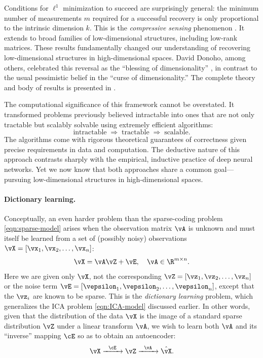 \documentclass[../../book-main.tex]{subfiles}
\begin{document}
Conditions for \(\ell^{1}\) minimization to succeed are surprisingly
general: the minimum number of measurements \(m\) required for a
successful recovery is only proportional to the intrinsic dimension
\(k\). This is the \textit{compressive sensing} phenomenon
\cite{CandesE2006-ICM}. It extends to broad families of
low-dimensional structures, including low-rank matrices. These
results fundamentally changed our understanding of recovering
low-dimensional structures in high-dimensional spaces. David Donoho,
among others, celebrated this reversal as the ``blessing of
dimensionality'' \cite{DonohoD2000}, in contrast to the usual
pessimistic belief in the ``curse of dimensionality.'' The complete
theory and body of results is presented in \cite{Wright-Ma-2022}.

The computational significance of this framework cannot be
overstated. It transformed problems previously believed intractable
into ones that are not only tractable but scalably solvable using
extremely efficient algorithms:
\begin{equation}
    \text{intractable} \;\Longrightarrow\; \text{tractable}
    \;\Longrightarrow\; \text{scalable}.
\end{equation}
The algorithms come with rigorous theoretical guarantees of
correctness given precise requirements in data and computation. The
deductive nature of this approach contrasts sharply with the
empirical, inductive practice of deep neural networks. Yet we now
know that both approaches share a common goal---pursuing
low-dimensional structures in high-dimensional spaces.

\paragraph{Dictionary learning.}
Conceptually, an even harder problem than the sparse-coding problem
\eqref{eqn:sparse-model} arises when the observation matrix \(\vA\)
is unknown and must itself be learned from a set of (possibly noisy)
observations \(\vX = [\vx_{1}, \vx_{2}, \ldots, \vx_{n}]\):
\begin{equation}
    \vX = \vA \vZ + \vE, \quad \vA \in \R^{m\times n}.
    \label{eqn:dictionary-learning}
\end{equation}
Here we are given only \(\vX\), not the corresponding \(\vZ =
[\vz_{1}, \vz_{2}, \ldots, \vz_{n}]\) or the noise term \(\vE =
[\vepsilon_{1}, \vepsilon_{2}, \ldots, \vepsilon_{n}]\), except that
the \(\vz_{i}\) are known to be sparse. This is the
\textit{dictionary learning} problem, which generalizes the ICA
problem \eqref{eqn:ICA-model} discussed earlier. In other words,
given that the distribution of the data \(\vX\) is the image of a
standard sparse distribution \(\vZ\) under a linear transform
\(\vA\), we wish to learn both \(\vA\) and its ``inverse'' mapping
\(\cE\) so as to obtain an autoencoder:
\begin{equation}
    \vX   \xrightarrow{\hspace{2mm} \cE\hspace{2mm}}  \vZ
    \xrightarrow{\hspace{2mm} \vA \hspace{2mm}} \hat{\vX}.
    \label{eqn:decoding-DL}
\end{equation}
\end{document}
